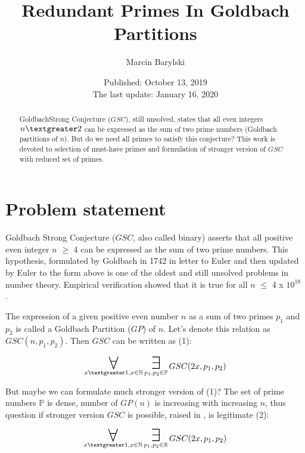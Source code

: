 \documentclass[10pt,twocolumn]{article}
\title{Redundant Primes In Goldbach Partitions}
\author{Marcin Barylski}
\date{\small{Published: October 13, 2019 \\ The last update: January 16, 2020}}
\newcommand\bigforall{\mbox{\huge $\mathsurround0pt\forall$}}
\newcommand\bigexists{\mbox{\huge $\mathsurround0pt\exists$}}
\begin{document}
\maketitle

\begin{abstract}
GoldbachStrong Conjecture ($GSC$), still unsolved, states that all even integers $n \textgreater 2$ can be expressed as the sum of two prime numbers (Goldbach partitions of $n$). But do we need all primes to satisfy this conjecture? This work is devoted to selection of must-have primes and formulation of stronger version of $GSC$ with reduced set of primes.
\end{abstract}

\section{Problem statement}

Goldbach Strong Conjecture ($GSC$, also called binary) asserts that all positive even integer $n$ $\geq$ 4 can be expressed as the sum of two prime numbers. This hypothesis, formulated by Goldbach in 1742 in letter to Euler \cite{goldbach1742} and then updated by Euler to the form above is one of the oldest and still unsolved problems in number theory. Empirical verification showed that it is true for all $n$ $\leq$ 4 x $10^{18}$ \cite{oliveira2012} \cite{oliveira2013}.\par
The expression of a given positive even number $n$ as a sum of two primes $p_1$ and $p_2$ is called a Goldbach Partition ($GP$) of $n$.  Let's denote this relation as $GSC(n, p_1, p_2)$. Then $GSC$ can be written as (1):

\begin{equation}
\displaystyle\mathop{\bigforall}_{x \textgreater 1, x \in \mathbb{N}} \displaystyle\mathop{\bigexists}_{p_1, p_2 \in \mathbb{P}} GSC (2x, p_1, p_2)
\end{equation}

But maybe we can formulate much stronger version of (1)? The set of prime numbers $\mathbb{P}$ is dense, number of $GP(n)$ is increasing with increasing $n$, thus question if stronger version $GSC$ is possible, raised in \cite{barylski2018}, is legitimate (2):

\begin{equation}
\displaystyle\mathop{\bigforall}_{x \textgreater 1, x \in \mathbb{N}} \displaystyle\mathop{\bigexists}_{p_1, p_2 \in \mathbb{R}} GSC (2x, p_1, p_2)
\end{equation}
\end{document}
